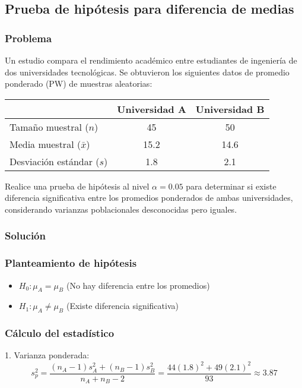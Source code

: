 \subsection{Prueba de hipótesis para diferencia de medias}

\subsubsection*{Problema}
Un estudio compara el rendimiento académico entre estudiantes de ingeniería de dos universidades tecnológicas. Se obtuvieron los siguientes datos de promedio ponderado (PW) de muestras aleatorias:

\begin{center}
\begin{tabular}{lcc}
\toprule
& Universidad A & Universidad B \\
\midrule
Tamaño muestral ($n$) & 45 & 50 \\
Media muestral ($\bar{x}$) & 15.2 & 14.6 \\
Desviación estándar ($s$) & 1.8 & 2.1 \\
\bottomrule
\end{tabular}
\end{center}

Realice una prueba de hipótesis al nivel $\alpha = 0.05$ para determinar si existe diferencia significativa entre los promedios ponderados de ambas universidades, considerando varianzas poblacionales desconocidas pero iguales.

\subsubsection*{Solución}

\subsubsection*{Planteamiento de hipótesis}
\begin{itemize}
\item $H_0: \mu_A = \mu_B$ (No hay diferencia entre los promedios)
\item $H_1: \mu_A \neq \mu_B$ (Existe diferencia significativa)
\end{itemize}

\subsubsection*{Cálculo del estadístico}
1. Varianza ponderada:
\[
s_p^2 = \frac{(n_A-1)s_A^2 + (n_B-1)s_B^2}{n_A+n_B-2} = \frac{44(1.8)^2 + 49(2.1)^2}{93} \approx 3.87
\]

